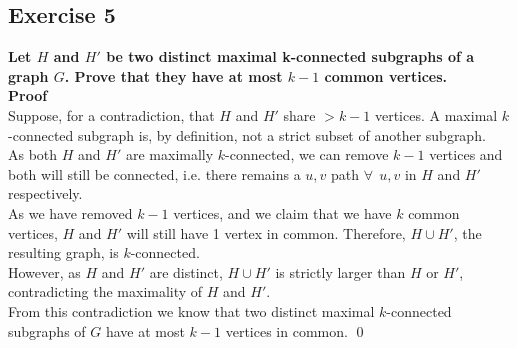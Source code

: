\subsection*{Exercise 5}
\textbf{Let $H$ and $H'$ be two distinct maximal k-connected subgraphs of a graph $G$. Prove that they have at most $k - 1$ common vertices.\\\linebreak Proof\\}
\unboldmath
Suppose, for a contradiction, that $H$ and $H'$ share $>k-1$ vertices. A maximal $k$-connected subgraph is, by definition, not a strict subset of another subgraph. \\
\linebreak 
As both $H$ and $H'$ are maximally $k$-connected, we can remove $k-1$ vertices and both will still be connected, i.e. there remains a $u,v$ path $\forall \:\: u,v$ in $H$ and $H'$ respectively. \\
\linebreak 
As we have removed $k-1$ vertices, and we claim that we have $k$ common vertices, $H$ and $H'$ will still have 1 vertex in common. Therefore, $H \cup H'$, the resulting graph, is $k$-connected.\\
\linebreak 
However, as $H$ and $H'$ are distinct, $H \cup H'$ is strictly larger than $H$ or $H'$, contradicting the maximality of $H$ and $H'$. \\
\linebreak 
From this contradiction we know that two distinct maximal $k$-connected subgraphs of $G$ have at most $k-1$ vertices in common. \qed